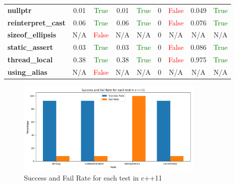 \documentclass{article}
\begin{document}
\begin{xltabular}{\textwidth}{lcccccccc}
\textbf{{\fontsize{10}{12}\selectfont nullptr}}& 0.01&\textcolor{green}{True}& 0.01&\textcolor{green}{True}& 0&\textcolor{red}{False}& 0.049&\textcolor{green}{True} \\[0.5ex]
\textbf{{\fontsize{10}{12}\selectfont reinterpret\_cast}}& 0.06&\textcolor{green}{True}& 0.06&\textcolor{green}{True}& 0&\textcolor{red}{False}& 0.076&\textcolor{green}{True} \\[0.5ex]
\textbf{{\fontsize{10}{12}\selectfont sizeof\_ellipsis}}& N/A&\textcolor{red}{False}& N/A&N/A& 0&N/A& N/A&N/A \\[0.5ex]
\textbf{{\fontsize{10}{12}\selectfont static\_assert}}& 0.03&\textcolor{green}{True}& 0.03&\textcolor{green}{True}& 0&\textcolor{red}{False}& 0.086&\textcolor{green}{True} \\[0.5ex]
\textbf{{\fontsize{10}{12}\selectfont thread\_local}}& 0.38&\textcolor{green}{True}& 0.38&\textcolor{green}{True}& 0&\textcolor{red}{False}& 0.975&\textcolor{green}{True} \\[0.5ex]
\textbf{{\fontsize{10}{12}\selectfont using\_alias}}& N/A&\textcolor{red}{False}& N/A&N/A& 0&N/A& N/A&N/A \\[0.5ex]
\bottomrule
\end{xltabular}
\newpage
\begin{figure}[h!]
\centering
\includegraphics[width=0.8\textwidth]{../reports/artisan/images/c++11.png}
\caption{Success and Fail Rate for each test in c++11}
\label{fig:c++11}
\end{figure}
\newpage
\end{document}
